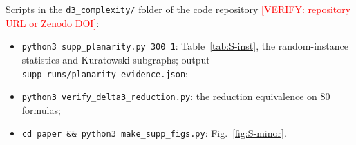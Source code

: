 \documentclass[aps,pre,onecolumn,superscriptaddress,nofootinbib]{revtex4-2}
\theoremstyle{remark}
\newcommand{\verify}[1]{\textcolor{red}{[VERIFY: #1]}}
\begin{document}
Scripts in the \texttt{d3\_complexity/} folder of the code repository \verify{repository URL or
Zenodo DOI}:
\begin{itemize}
\item \texttt{python3 supp\_planarity.py 300 1}: Table~\ref{tab:S-inst}, the random-instance
statistics and Kuratowski subgraphs; output \texttt{supp\_runs/planarity\_evidence.json};
\item \texttt{python3 verify\_delta3\_reduction.py}: the reduction equivalence on 80 formulas;
\item \texttt{cd paper \&\& python3 make\_supp\_figs.py}: Fig.~\ref{fig:S-minor}.
\end{itemize}


\end{document}
